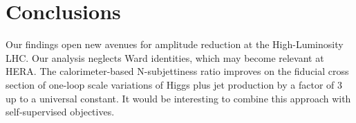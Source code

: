 \section{Conclusions}\label{sec:conclusions}

Our findings open new avenues for amplitude reduction at the
High-Luminosity LHC. Our analysis neglects Ward identities, which may
become relevant at HERA. The calorimeter-based N-subjettiness ratio
improves on the fiducial cross section of one-loop scale variations of
Higgs plus jet production by a factor of 3 up to a universal constant.
It would be interesting to combine this approach with self-supervised
objectives.

